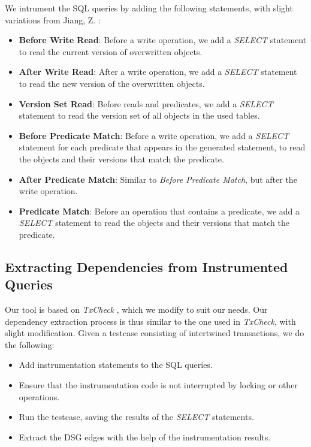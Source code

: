 We intrument the SQL queries by adding the following statements, with slight variations from Jiang, Z. \cite{jiang2023detecting}:
\begin{itemize}
    \item \textbf{Before Write Read}: Before a write operation, we add a \textit{SELECT} statement to read the current version of overwritten objects.
    \item \textbf{After Write Read}: After a write operation, we add a \textit{SELECT} statement to read the new version of the overwritten objects.
    \item \textbf{Version Set Read}: Before reads and predicates, we add a \textit{SELECT} statement to read the version set of all objects in the used tables.
    \item \textbf{Before Predicate Match}: Before a write operation, we add a \textit{SELECT} statement for each predicate that appears in the generated statement, to read the objects and their versions that match the predicate.
    \item \textbf{After Predicate Match}: Similar to \textit{Before Predicate Match}, but after the write operation.
    \item \textbf{Predicate Match}: Before an operation that contains a predicate, we add a \textit{SELECT} statement to read the objects and their versions that match the predicate.
\end{itemize}

\subsection{Extracting Dependencies from Instrumented Queries}

Our tool is based on \textit{TxCheck} \cite{jiang2023detecting}, which we modify to suit our needs. Our dependency extraction process is thus similar to the one used in \textit{TxCheck}, with slight modification. Given a testcase consisting of intertwined transactions, we do the following:

\begin{itemize}
    \item Add instrumentation statements to the SQL queries.
    \item Ensure that the instrumentation code is not interrupted by locking or other operations.
    \item Run the testcase, saving the results of the \textit{SELECT} statements.
    \item Extract the DSG edges with the help of the instrumentation results. 
\end{itemize}

